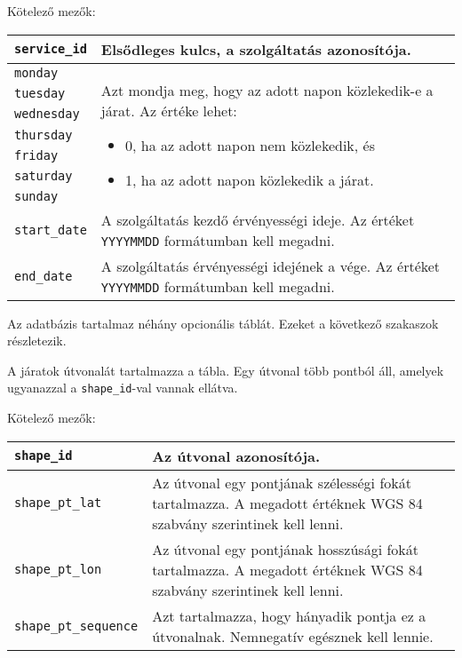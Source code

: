 \medskip

\noindent Kötelező mezők:

\bigskip

\begin{tabular}{|p{3.5cm}|p{10cm}|}
\hline
\texttt{service\_id} & Elsődleges kulcs, a szolgáltatás azonosítója. \\
\hline
\texttt{monday} & \multirow{7}{10cm}{Azt mondja meg, hogy az adott napon közlekedik-e a járat.
Az értéke lehet:
\begin{itemize}
\item 0, ha az adott napon nem közlekedik, és
\item 1, ha az adott napon közlekedik a járat.
\end{itemize}}
\\
\cline{1-1}
\texttt{tuesday} & \\
\cline{1-1}
\texttt{wednesday} & \\
\cline{1-1}
\texttt{thursday} & \\
\cline{1-1}
\texttt{friday} & \\
\cline{1-1}
\texttt{saturday} & \\
\cline{1-1}
\texttt{sunday} & \\
\hline
\texttt{start\_date} & A szolgáltatás kezdő érvényességi ideje. Az értéket \texttt{YYYYMMDD} formátumban kell megadni. \\
\hline
\texttt{end\_date} & A szolgáltatás érvényességi idejének a vége. Az értéket \texttt{YYYYMMDD} formátumban kell megadni. \\
\hline
\end{tabular}


Az adatbázis tartalmaz néhány opcionális táblát. Ezeket a következő szakaszok részletezik.


A járatok útvonalát tartalmazza a tábla. Egy útvonal több pontból áll, amelyek ugyanazzal a \texttt{shape\_id}-val vannak ellátva.

\newpage

\noindent Kötelező mezők:

\bigskip

\begin{tabular}{|p{3.7cm}|p{9.8cm}|}
\hline
\texttt{shape\_id} & Az útvonal azonosítója. \\
\hline
\texttt{shape\_pt\_lat} & Az útvonal egy pontjának szélességi fokát tartalmazza. A megadott értéknek WGS 84 szabvány szerintinek kell lenni. \\
\hline
\texttt{shape\_pt\_lon} & Az útvonal egy pontjának hosszúsági fokát tartalmazza. A megadott értéknek WGS 84 szabvány szerintinek kell lenni. \\
\hline
\texttt{shape\_pt\_sequence} & Azt tartalmazza, hogy hányadik pontja ez a útvonalnak. Nemnegatív egésznek kell lennie. \\
\hline
\end{tabular}


